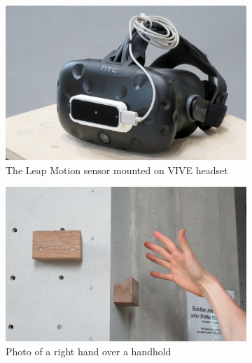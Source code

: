 \begin{figure}[ht]
    \centering
        \begin{subfigure}[t]{0.32\textwidth}
    	\centering
       	\includegraphics[width=\textwidth]{include/images/leap-motion-overlay-setup.jpg}
    	\caption{The Leap Motion sensor mounted on VIVE headset}
    	\label{fig:leap-motion-setup}
    \end{subfigure}
    \hfill
    \begin{subfigure}[t]{0.32\textwidth}
        \centering
       	\includegraphics[width=\textwidth]{include/images/leap-motion-overlay-photo.jpg}
        \caption{Photo of a right hand over a handhold}
        \label{fig:leap-motion-overlay-photo}
    \end{subfigure}
    \hfill
	\begin{subfigure}[t]{0.32\textwidth}
		\centering

\end{subfigure}
\end{figure}
